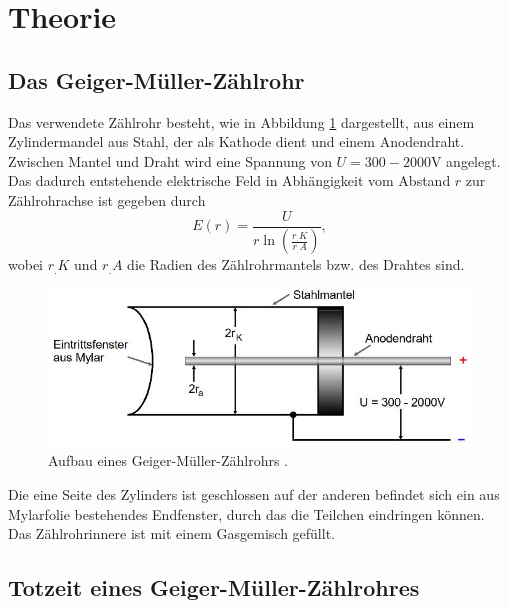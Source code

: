 \section{Theorie}
\label{sec:Theorie}

\subsection{Das Geiger-Müller-Zählrohr}
Das verwendete Zählrohr besteht, wie in Abbildung \ref{fig:GMZ} dargestellt, aus einem Zylindermandel aus Stahl, der als Kathode dient und einem Anodendraht. Zwischen Mantel und Draht wird eine Spannung von $U= 300 - 2000 \text{V}$ angelegt. Das dadurch entstehende elektrische Feld in Abhängigkeit vom Abstand $r$ zur Zählrohrachse ist gegeben durch
\[
E(r)=\frac{U}{r\ln\left(\frac{r_.K}{r_.A}\right)},
\]
wobei $r_.K$ und $r_.A$ die Radien des Zählrohrmantels bzw. des Drahtes sind.\newline
\begin{figure}
\centering
\includegraphics[scale=0.5]{content/images/aufbau1.jpg}
\caption{Aufbau eines Geiger-Müller-Zählrohrs \cite{V703}.}
\label{fig:GMZ}
\end{figure}
Die eine Seite des Zylinders ist geschlossen auf der anderen befindet sich ein aus Mylarfolie bestehendes Endfenster, durch das die Teilchen eindringen können. Das Zählrohrinnere ist mit einem Gasgemisch gefüllt.
\subsection{Totzeit eines Geiger-Müller-Zählrohres}

